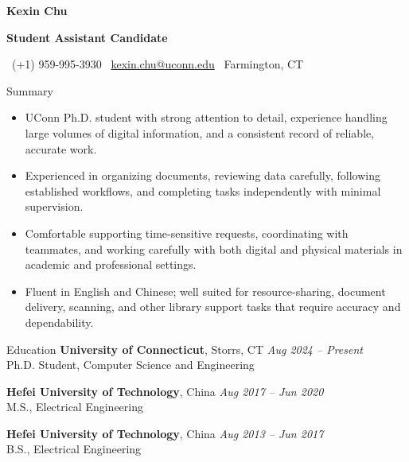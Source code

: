 \documentclass[]{resume}
\newcommand{\sectionvspace}{\vspace{1.5pt}}
\newcommand{\MakeHeader}[5]{%
\noindent
{\centering \bfseries \LARGE #1 \par}
\vspace{2pt}

\noindent
\colorbox{HeaderOrange}{%
  \parbox{\textwidth}{%
    \vspace{2pt}
    \centering
    {\color{white}\bfseries\normalsize #2}
    \vspace{2pt}
  }%
}\par

\noindent
\colorbox{HeaderLight}{%
  \parbox{\textwidth}{%
    \vspace{2pt}
    \small
    \faPhone\ #3 \hfill
    \faEnvelope\ \href{mailto:#4}{#4} \hfill
    \faMapMarker*\ #5
    \vspace{2pt}
  }%
}\par
}
\begin{document}
\MakeHeader
{Kexin Chu}
{Student Assistant Candidate}
{(+1) 959-995-3930}
{kexin.chu@uconn.edu}
{Farmington, CT}

\begin{rSection}{Summary}\sectionvspace
\begin{itemize}
    \item UConn Ph.D. student with strong attention to detail, experience handling large volumes of digital information, and a consistent record of reliable, accurate work.
    \item Experienced in organizing documents, reviewing data carefully, following established workflows, and completing tasks independently with minimal supervision.
    \item Comfortable supporting time-sensitive requests, coordinating with teammates, and working carefully with both digital and physical materials in academic and professional settings.
    \item Fluent in English and Chinese; well suited for resource-sharing, document delivery, scanning, and other library support tasks that require accuracy and dependability.
\end{itemize}
\end{rSection}

\begin{rSection}{Education}\sectionvspace
\textbf{University of Connecticut}, Storrs, CT \hfill \textit{Aug 2024 -- Present}\\
Ph.D. Student, Computer Science and Engineering

\textbf{Hefei University of Technology}, China \hfill \textit{Aug 2017 -- Jun 2020}\\
M.S., Electrical Engineering

\textbf{Hefei University of Technology}, China \hfill \textit{Aug 2013 -- Jun 2017}\\
B.S., Electrical Engineering
\end{rSection}
\end{document}
